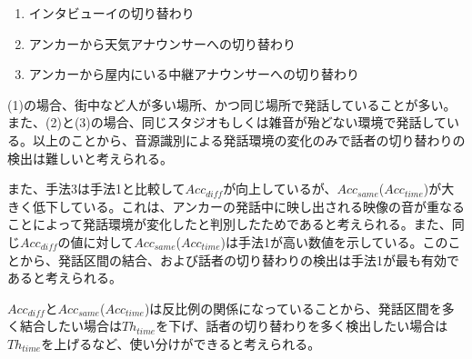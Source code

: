 \begin{enumerate}
\item インタビューイの切り替わり
\item アンカーから天気アナウンサーへの切り替わり
\item アンカーから屋内にいる中継アナウンサーへの切り替わり
\end{enumerate}

(1)の場合、街中など人が多い場所、かつ同じ場所で発話していることが多い。また、(2)と(3)の場合、同じスタジオもしくは雑音が殆どない環境で発話している。以上のことから、音源識別による発話環境の変化のみで話者の切り替わりの検出は難しいと考えられる。\par
また、手法3は手法1と比較して$Acc_{diff}$が向上しているが、$Acc_{same}$($Acc_{time}$)が大きく低下している。これは、アンカーの発話中に映し出される映像の音が重なることによって発話環境が変化したと判別したためであると考えられる。また、同じ$Acc_{diff}$の値に対して$Acc_{same}$($Acc_{time}$)は手法1が高い数値を示している。このことから、発話区間の結合、および話者の切り替わりの検出は手法1が最も有効であると考えられる。\par
$Acc_{diff}$と$Acc_{same}$($Acc_{time}$)は反比例の関係になっていることから、発話区間を多く結合したい場合は$Th_{time}$を下げ、話者の切り替わりを多く検出したい場合は$Th_{time}$を上げるなど、使い分けができると考えられる。
